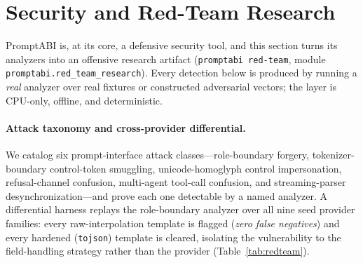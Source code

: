 \documentclass[10pt]{article}
\begin{document}
\section{Security and Red-Team Research}
\label{sec:redteam}

PromptABI is, at its core, a defensive security tool, and this section turns its
analyzers into an offensive research artifact (\texttt{promptabi red-team}, module
\texttt{promptabi.red\_team\_research}). Every detection below is produced by
running a \emph{real} analyzer over real fixtures or constructed adversarial
vectors; the layer is CPU-only, offline, and deterministic.

\paragraph{Attack taxonomy and cross-provider differential.}
We catalog six prompt-interface attack classes---role-boundary forgery,
tokenizer-boundary control-token smuggling, unicode-homoglyph control
impersonation, refusal-channel confusion, multi-agent tool-call confusion, and
streaming-parser desynchronization---and prove each one detectable by a named
analyzer. A differential harness replays the role-boundary analyzer over all nine
seed provider families: every raw-interpolation template is flagged
(\emph{zero false negatives}) and every hardened (\texttt{tojson}) template is
cleared, isolating the vulnerability to the field-handling strategy rather than
the provider (Table~\ref{tab:redteam}).
\end{document}

